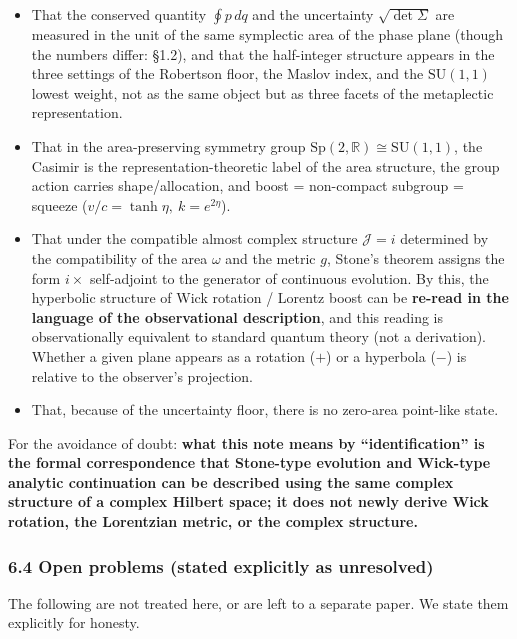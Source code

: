 \documentclass[
]{article}
\providecommand{\tightlist}{%
  \setlength{\itemsep}{0pt}\setlength{\parskip}{0pt}}
\begin{document}
\begin{itemize}
\tightlist
\item
  That the conserved quantity \(\oint p\,dq\) and the uncertainty
  \(\sqrt{\det\Sigma}\) are measured in the unit of the same symplectic
  area of the phase plane (though the numbers differ: §1.2), and that
  the half-integer structure appears in the three settings of the
  Robertson floor, the Maslov index, and the \(\mathrm{SU}(1,1)\) lowest
  weight, not as the same object but as three facets of the metaplectic
  representation.
\item
  That in the area-preserving symmetry group
  \(\mathrm{Sp}(2,\mathbb{R})\cong\mathrm{SU}(1,1)\), the Casimir is the
  representation-theoretic label of the area structure, the group action
  carries shape/allocation, and boost = non-compact subgroup = squeeze
  (\(v/c=\tanh\eta,\ k=e^{2\eta}\)).
\item
  That under the compatible almost complex structure \(\mathcal{J}=i\)
  determined by the compatibility of the area \(\omega\) and the metric
  \(g\), Stone's theorem assigns the form \(i\times\) self-adjoint to
  the generator of continuous evolution. By this, the hyperbolic
  structure of Wick rotation / Lorentz boost can be \textbf{re-read in
  the language of the observational description}, and this reading is
  observationally equivalent to standard quantum theory (not a
  derivation). Whether a given plane appears as a rotation (\(+\)) or a
  hyperbola (\(-\)) is relative to the observer's projection.
\item
  That, because of the uncertainty floor, there is no zero-area
  point-like state.
\end{itemize}

For the avoidance of doubt: \textbf{what this note means by
``identification'' is the formal correspondence that Stone-type
evolution and Wick-type analytic continuation can be described using the
same complex structure of a complex Hilbert space; it does not newly
derive Wick rotation, the Lorentzian metric, or the complex structure.}

\subsubsection{6.4 Open problems (stated explicitly as
unresolved)}\label{open-problems-stated-explicitly-as-unresolved}

The following are not treated here, or are left to a separate paper. We
state them explicitly for honesty.
\end{document}
